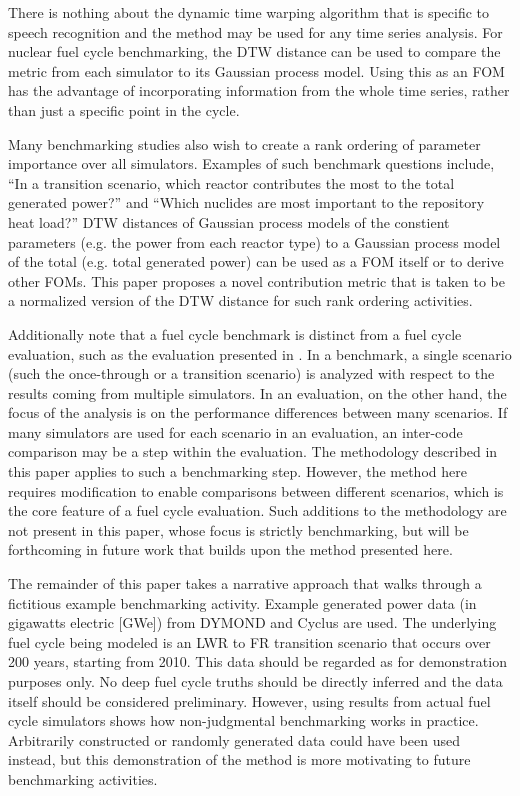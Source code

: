 There is nothing about the dynamic time warping algorithm that is specific 
to speech recognition and the method
may be used for any time series analysis. For nuclear fuel cycle benchmarking,
the DTW distance can be used to compare the metric from each simulator to its
Gaussian process model. Using this as an FOM has the advantage of 
incorporating information from the whole time series, rather than just a 
specific point in the cycle.

Many benchmarking studies also wish to create a rank ordering of parameter
importance over all simulators. Examples of such benchmark questions include, 
``In a transition scenario,
which reactor contributes the most to the total generated power?'' and 
``Which
nuclides are most important to the repository heat load?'' DTW distances 
of Gaussian process models of the constient parameters (e.g. the power from
each reactor type) to a Gaussian process model of the total (e.g. total 
generated power) can be used as a FOM itself or to derive other FOMs. 
This paper proposes a novel contribution metric
that is taken to be a normalized version of the DTW 
distance for such rank ordering activities.

Additionally note that a fuel cycle benchmark is distinct from a 
fuel cycle evaluation, such as the evaluation presented in 
\cite{wigeland2014nuclear}.
In a benchmark, a single scenario (such the once-through or a transition 
scenario) is analyzed with respect to the results coming from multiple 
simulators. In an evaluation, on the other hand, the focus of the analysis
is on the performance differences between many scenarios. If many simulators
are used for each scenario in an evaluation, an inter-code comparison may 
be a step within the evaluation. The methodology described in this paper
applies to such a benchmarking step. However, 
the method here requires modification to enable comparisons
between different scenarios, which is the core feature of a fuel cycle evaluation.
Such additions to the methodology 
are not present in this paper, whose focus is strictly benchmarking, but will
be forthcoming in future work that builds upon the method presented here. 

The remainder of this paper takes a narrative approach that walks through 
a fictitious example benchmarking activity. Example generated power data 
(in gigawatts electric [GWe]) 
from DYMOND \cite{yacout2005modeling,feng2015dymond} and Cyclus 
\cite{DBLP:journals/corr/HuffGCFMOSSW15,cyclus_v1_0} are used. 
The underlying fuel cycle being modeled is an
LWR to FR transition scenario that occurs over 200 years, starting from 2010.  
This data should be regarded as for demonstration purposes only. No deep
fuel cycle truths should be directly inferred and the data itself should be 
considered preliminary. However, 
using results from actual fuel cycle simulators shows how
non-judgmental benchmarking works in practice. Arbitrarily constructed 
or randomly generated data could 
have been used instead, but this demonstration of the method is more 
motivating to future benchmarking activities.

